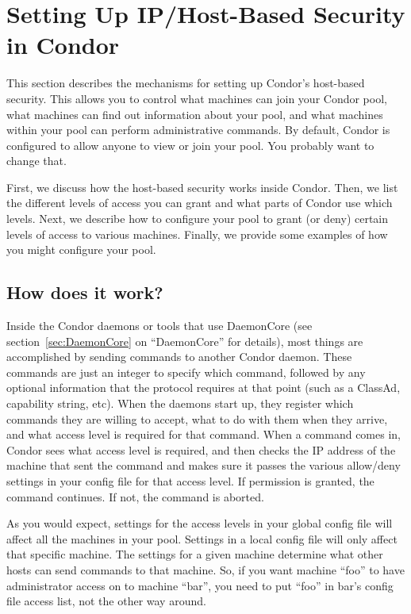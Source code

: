 \section{\label{sec:Host-Security}Setting Up IP/Host-Based Security in
Condor} 

This section describes the mechanisms for setting up Condor's
host-based security.  This allows you to control what machines can
join your Condor pool, what machines can find out information about
your pool, and what machines within your pool can perform
administrative commands.  By default, Condor is configured to allow
anyone to view or join your pool.  You probably want to change that.

First, we discuss how the host-based security works inside Condor.
Then, we list the different levels of access you can grant and what
parts of Condor use which levels.  Next, we describe how to configure
your pool to grant (or deny) certain levels of access to various
machines.  Finally, we provide some examples of how you might
configure your pool.

\subsection{\label{sec:How-Host-Security-Works}How does it work?}

Inside the Condor daemons or tools that use DaemonCore (see
section~\ref{sec:DaemonCore} on ``DaemonCore'' for details), most
things are accomplished by sending commands to another Condor daemon.
These commands are just an integer to specify which command, followed
by any optional information that the protocol requires at that point
(such as a ClassAd, capability string, etc).  When the daemons start
up, they register which commands they are willing to accept, what to
do with them when they arrive, and what access level is required for
that command.  When a command comes in, Condor sees what access level
is required, and then checks the IP address of the machine that sent
the command and makes sure it passes the various allow/deny settings
in your config file for that access level.  If permission is granted,
the command continues.  If not, the command is aborted.

As you would expect, settings for the access levels in your global
config file will affect all the machines in your pool.  Settings in a
local config file will only affect that specific machine.  The
settings for a given machine determine what other hosts can send
commands to that machine.  So, if you want machine ``foo'' to have
administrator access on to machine ``bar'', you need to put ``foo'' in
bar's config file access list, not the other way around.

